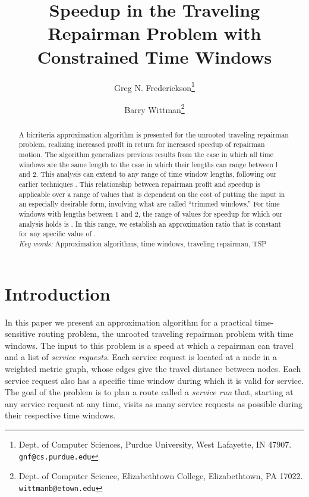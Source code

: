 \documentclass[11pt]{article}
\begin{document}
\title{Speedup in the Traveling Repairman Problem with Constrained Time Windows}
\author{Greg N. Frederickson\thanks{Dept. of Computer Sciences, Purdue University, West Lafayette,
    IN 47907. {\tt gnf@cs.purdue.edu}} \and Barry Wittman\thanks{Dept. of Computer Science, Elizabethtown College, Elizabethtown,
    PA 17022. {\tt wittmanb@etown.edu}}
}

\maketitle




\begin{abstract}
A bicriteria approximation algorithm is presented for the unrooted traveling repairman problem, realizing increased profit in return for increased speedup of repairman motion.  The algorithm generalizes previous results from the case in which all time windows are the same length to the case in which their lengths can range between l and 2.  This analysis can extend to any range of time window lengths, following our earlier techniques \cite{Frederickson6}.
This relationship between repairman profit and speedup is applicable over a range of values that is dependent on the cost of putting the input in an especially desirable form, involving what are called ``trimmed windows.''  For time windows with lengths between 1 and 2, the range of values for speedup  for which our analysis holds is .  In this range, we establish an approximation ratio that is constant for any specific value of .\\

\noindent\emph{Key words:} Approximation algorithms, time windows, traveling repairman, TSP
\end{abstract}

\section{Introduction}

In this paper we present an approximation algorithm for a practical time-sensitive routing problem, the unrooted traveling repairman problem with time windows.  The input to this problem is a speed at which a repairman can travel and a list of {\em service requests}.  Each service request is located at a node in a weighted metric graph, whose edges give the travel distance between nodes.  Each service request also has a specific time window during which it is valid for service.  The goal of the problem is to plan a route called a {\em service run} that, starting at any service request at any time, visits as many service requests as possible during their respective time windows.
\end{document}
